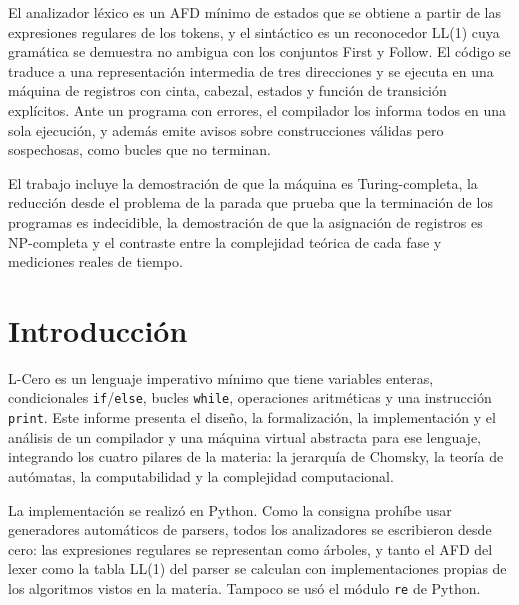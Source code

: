 \documentclass[11pt,a4paper]{article}
\theoremstyle{definition}
\newcommand{\tm}[1]{\texttt{#1}}
\begin{document}
El analizador léxico es un AFD mínimo de \NMin{} estados que se obtiene a
partir de las expresiones regulares de los tokens, y el sintáctico es un
reconocedor LL(1) cuya gramática se demuestra no ambigua con los conjuntos
First y Follow. El código se traduce a una representación intermedia de tres
direcciones y se ejecuta en una máquina de registros con cinta, cabezal,
estados y función de transición explícitos. Ante un programa con errores, el
compilador los informa todos en una sola ejecución, y además emite avisos
sobre construcciones válidas pero sospechosas, como bucles que no terminan.

El trabajo incluye la demostración de que la máquina es Turing-completa, la
reducción desde el problema de la parada que prueba que la terminación de los
programas es indecidible, la demostración de que la asignación de registros
es NP-completa y el contraste entre la complejidad teórica de cada fase y
mediciones reales de tiempo.

\begin{flushright}
\textbf{\textit{\FechaLarga}}
\end{flushright}
\newpage

\tableofcontents
\newpage

\section{Introducción}

L-Cero es un lenguaje imperativo mínimo que tiene variables enteras,
condicionales \tm{if}/\tm{else}, bucles \tm{while}, operaciones aritméticas
y una instrucción \tm{print}. Este informe presenta el diseño, la
formalización, la implementación y el análisis de un compilador y una
máquina virtual abstracta para ese lenguaje, integrando los cuatro pilares
de la materia: la jerarquía de Chomsky, la teoría de autómatas, la
computabilidad y la complejidad computacional.

La implementación se realizó en Python. Como la consigna prohíbe usar
generadores automáticos de parsers, todos los analizadores se escribieron
desde cero: las expresiones regulares se representan como árboles, y tanto
el AFD del lexer como la tabla LL(1) del parser se calculan con
implementaciones propias de los algoritmos vistos en la materia. Tampoco se
usó el módulo \tm{re} de Python.
\end{document}
